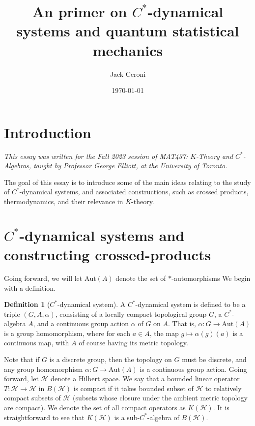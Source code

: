 \documentclass[aps,pra,showpacs,notitlepage,onecolumn,superscriptaddress,nofootinbib]{revtex4-1}
\theoremstyle{definition}
\newtheorem{definition}{Definition}[section]
\begin{document}
\title{An primer on $C^{*}$-dynamical systems and quantum statistical mechanics}
\author{Jack Ceroni}

\date{\today}

\maketitle

\section{Introduction}

\noindent \emph{This essay was written for the Fall 2023 session of MAT437: $K$-Theory and $C^{*}$-Algebras, taught by Professor George Elliott, at the University of Toronto.}
\newline

\noindent The goal of this essay is to introduce some of the main ideas relating to the study of $C^{*}$-dynamical systems, and associated constructions, such as crossed products, thermodynamics,
and their relevance in $K$-theory.

\section{$C^{*}$-dynamical systems and constructing crossed-products}

\noindent Going forward, we will let $\text{Aut}(A)$ denote the set of $*$-automorphisms We begin with a definition.

\begin{definition}[$C^{*}$-dynamical system]
  A $C^{*}$-dynamical system is defined to be a triple $(G, A, \alpha)$, consisting of a locally compact topological group $G$, a $C^{*}$-algebra $A$,
  and a continuous group action $\alpha$ of $G$ on $A$. That is, $\alpha : G \rightarrow \text{Aut}(A)$ is a group homomorphism, where for each $a \in A$, the map $g \mapsto \alpha(g)(a)$
  is a continuous map, with $A$ of course having its metric topology.
\end{definition}

\noindent Note that if $G$ is a discrete group, then the topology on $G$ must be discrete, and any group homomorphism $\alpha : G \rightarrow \text{Aut}(A)$ is a continuous group action.
Going forward, let $\mathcal{H}$ denote a Hilbert space. We say that a bounded linear operator $T : \mathcal{H} \rightarrow \mathcal{H}$ in $B(\mathcal{H})$ is compact if
it takes bounded subset of $\mathcal{H}$ to relatively compact subsets of $\mathcal{H}$ (subsets whose closure under the ambient metric topology are compact). We denote the set of all compact operators
as $K(\mathcal{H})$. It is straightforward to
see that $K(\mathcal{H})$ is a sub-$C^{*}$-algebra of $B(\mathcal{H})$.
\end{document}
